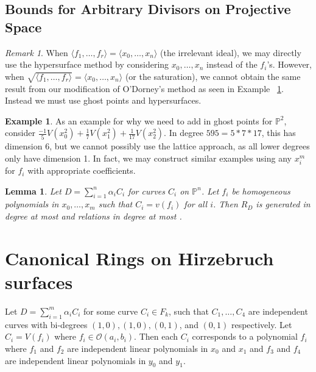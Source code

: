 \documentclass{amsart}
\theoremstyle{plain}
\newtheorem{lem}[thm]{Lemma}
\theoremstyle{definition}
\newtheorem{example}[thm]{Example}
\theoremstyle{remark}
\newtheorem{rem}[thm]{Remark}
\numberwithin{equation}{section}
\newcommand\ssec{\subsection}
\newcommand\bp{{\mathbb P}}
\newcommand\bida{a}
\newcommand\bidb{b}
\begin{document}

\ssec{Bounds for Arbitrary Divisors on Projective Space}

\begin{rem}
When $\langle f_1, \ldots, f_r \rangle = \langle x_0, \ldots, x_n \rangle$ (the irrelevant ideal), we may directly use the hypersurface method by considering $x_0, \ldots, x_n$ instead of the $f_i$'s. However, when $\sqrt{\langle f_1, \ldots, f_r \rangle} = \langle x_0, \ldots, x_n \rangle$ (or the saturation), we cannot obtain the same result from our modification of O'Dorney's method as seen in Example ~\ref{eg:radical}. Instead we must use ghost points and hypersurfaces.
\end{rem}

\begin{example}
\label{eg:radical}
As an example for why we need to add in ghost points for $\bp^2$, consider $\frac{-1}{5}V(x_0^2) + \frac{1}{7}V(x_1^2) + \frac{1}{17}V(x_2^2)$. In degree $595 = 5* 7 * 17$, this has dimension $6$, but we cannot possibly use the lattice approach, as all lower degrees only have dimension 1. In fact, we may construct similar examples using any $x_i^m$ for $f_i$ with appropriate coefficients.
\end{example}

\begin{lem}
Let $D = \sum_{i=1}^n \alpha_i C_i$ for curves $C_i$ on $\mathbb{P}^n$.  Let $f_i$ be homogeneous polynomials in $x_0, \ldots, x_m$ such that $C_i = v(f_i)$ for all $i$.  Then $R_D$ is generated in degree at most    and relations in degree at most  . 
\end{lem}

\section{Canonical Rings on Hirzebruch surfaces}
Let $D=\sum_{i=1}^m \alpha_i C_i$ for some curve $C_i\in F_k$, such
that $C_1, \ldots, C_4$ are independent curves with bi-degrees $(1,0)
, (1,0), (0,1)$, and $(0,1)$ respectively. Let $C_i = V(f_i)$ where
$f_i \in \mathscr{O}(\bida_i, \bidb_i)$. Then each $C_i$ corresponds to a
polynomial $f_i$ where $f_1$ and $f_2$ are independent linear
polynomials in $x_0$ and $x_1$ and $f_3$ and $f_4$ are independent
linear polynomials in $y_0$ and $y_1$.
\end{document}
